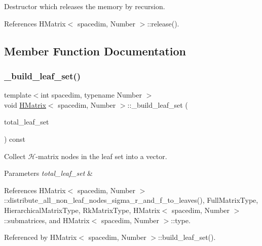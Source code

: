 Destructor which releases the memory by recursion. 

References H\+Matrix$<$ spacedim, Number $>$\+::release().



\subsection{Member Function Documentation}
\mbox{\label{classHMatrix_a60934e84cc3c9f6c75d011a2005f512a}} 
\subsubsection{\texorpdfstring{\+\_\+build\+\_\+leaf\+\_\+set()}{\_build\_leaf\_set()}}
{\footnotesize\ttfamily template$<$int spacedim, typename Number $>$ \\
void \hyperlink{classHMatrix}{H\+Matrix}$<$ spacedim, Number $>$\+::\+\_\+build\+\_\+leaf\+\_\+set (\begin{DoxyParamCaption}\item[{std\+::vector$<$ \hyperlink{classHMatrix}{H\+Matrix}$<$ spacedim, Number $>$ $\ast$$>$ \&}]{total\+\_\+leaf\+\_\+set }\end{DoxyParamCaption}) const\hspace{0.3cm}{\ttfamily [private]}}

Collect $\mathcal{H}$-\/matrix nodes in the leaf set into a vector. 
\begin{DoxyParams}{Parameters}
{\em total\+\_\+leaf\+\_\+set} & \\
\hline
\end{DoxyParams}


References H\+Matrix$<$ spacedim, Number $>$\+::distribute\+\_\+all\+\_\+non\+\_\+leaf\+\_\+nodes\+\_\+sigma\+\_\+r\+\_\+and\+\_\+f\+\_\+to\+\_\+leaves(), Full\+Matrix\+Type, Hierarchical\+Matrix\+Type, Rk\+Matrix\+Type, H\+Matrix$<$ spacedim, Number $>$\+::submatrices, and H\+Matrix$<$ spacedim, Number $>$\+::type.



Referenced by H\+Matrix$<$ spacedim, Number $>$\+::build\+\_\+leaf\+\_\+set().

\mbox{\label{classHMatrix_ab55b568236ffdd71b5378ac6c6ace50a}} 

